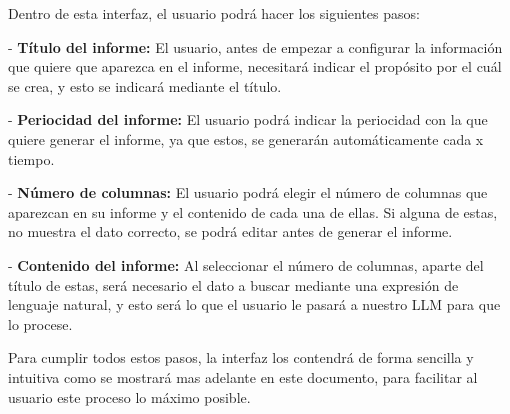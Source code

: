 Dentro de esta interfaz, el usuario podrá hacer los siguientes pasos:

- \textbf{Título del informe:} El usuario, antes de empezar a configurar la información que quiere que aparezca en el informe, necesitará indicar el propósito por el cuál se crea, y
esto se indicará mediante el título.

- \textbf{Periocidad del informe:} El usuario podrá indicar la periocidad con la que quiere generar el informe, ya que estos, se generarán automáticamente cada x tiempo.

- \textbf{Número de columnas:} El usuario podrá elegir el número de columnas que aparezcan en su informe y el contenido de cada una de ellas. Si alguna de estas, no muestra
el dato correcto, se podrá editar antes de generar el informe.

- \textbf{Contenido del informe: } Al seleccionar el número de columnas, aparte del título de estas, será necesario el dato a buscar mediante una expresión de lenguaje natural, y 
esto será lo que el usuario le pasará a nuestro LLM para que lo procese.

Para cumplir todos estos pasos, la interfaz los contendrá de forma sencilla y intuitiva como se mostrará mas adelante en este documento, para facilitar al usuario
este proceso lo máximo posible.

